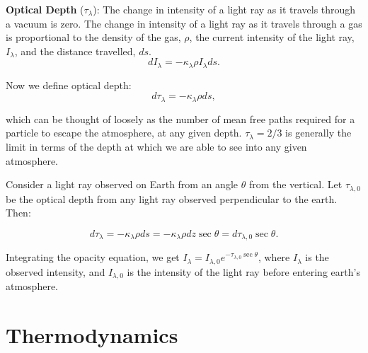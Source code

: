 \documentclass[12pt]{article}
\newcommand{\V}{

\vspace{\baselineskip}

}
\begin{document}
\V

\textbf{Optical Depth} ($\tau_{\lambda}$): 
The change in intensity of a light ray as it travels through a vacuum is zero. The change in intensity of a light ray as it travels through a gas is proportional to the density of the gas, $\rho$, the current intensity of the light ray, $I_{\lambda}$, and the distance travelled, $ds$.
\[dI_{\lambda} = -\kappa_{\lambda}\rho I_{\lambda}ds.\]

Now we define optical depth:
\[d\tau_{\lambda} = -\kappa_{\lambda}\rho ds,\]

which can be thought of loosely as the number of mean free paths required for a particle to escape the atmosphere, at any given depth. $\tau_{\lambda} = 2/3$ is generally the limit in terms of the depth at which we are able to see into any given atmosphere.

Consider a light ray observed on Earth from an angle $\theta$ from the vertical. Let $\tau_{\lambda, 0}$ be the optical depth from any light ray observed perpendicular to the earth. Then: 

\[d\tau_{\lambda} = -\kappa_{\lambda}\rho ds = -\kappa_{\lambda}\rho dz \sec{\theta} = d\tau_{\lambda, 0}\sec{\theta}.\]

Integrating the opacity equation, we get 
$I_{\lambda} = I_{\lambda,0}e^{-\tau_{\lambda, 0}\sec{\theta}}$, where $I_{\lambda}$ is the observed intensity, and $I_{\lambda,0}$ is the intensity of the light ray before entering earth's atmosphere.

\newpage
\section{Thermodynamics}
\end{document}
